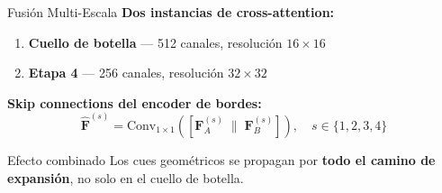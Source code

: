 \documentclass[aspectratio=169]{beamer}
\begin{document}
\begin{frame}{Fusión Multi-Escala}
\textbf{Dos instancias de cross-attention:}
\vspace{0.3em}
\begin{enumerate}
    \item \textbf{Cuello de botella} — 512 canales, resolución $16{\times}16$
    \item \textbf{Etapa 4} — 256 canales, resolución $32{\times}32$
\end{enumerate}
\vspace{0.5em}
\textbf{Skip connections del encoder de bordes:}
\begin{equation*}
\hat{\mathbf{F}}^{(s)} = \text{Conv}_{1\times1}\!\left(\left[\mathbf{F}_A^{(s)} \;\|\; \mathbf{F}_B^{(s)}\right]\right), \quad s \in \{1,2,3,4\}
\end{equation*}
\vspace{0.2em}
\begin{block}{Efecto combinado}
Los cues geométricos se propagan por \textbf{todo el camino de expansión}, no solo en el cuello de botella.
\end{block}
\end{frame}
\end{document}
